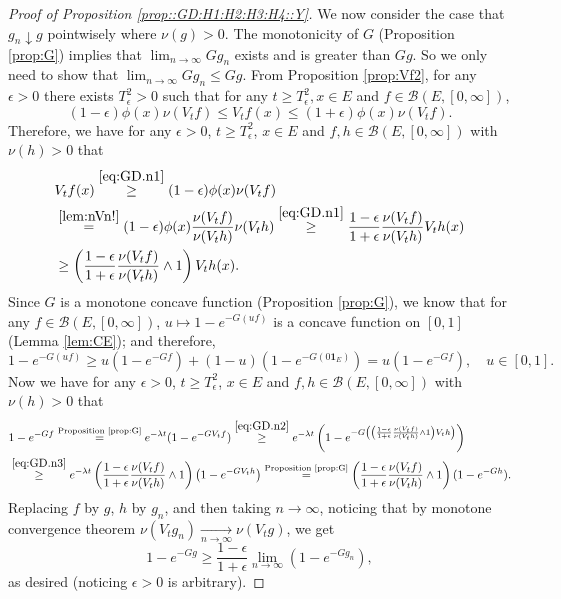 \documentclass[12pt,a4paper]{amsart}
\numberwithin{equation}{section}
\theoremstyle{plain}
\theoremstyle{definition}
\theoremstyle{remark}
\begin{document}
\begin{proof}[Proof of Proposition \ref{prop::GD:H1:H2:H3:H4::Y}]
	We now consider the case that $g_n \downarrow g$ pointwisely
	where $\nu(g) > 0$.
	The monotonicity of $G$ (Proposition \ref{prop:G}) implies that $\lim_{n \to \infty} Gg_n$ exists and is greater
	than $G g$.
	So we only need to show that $\lim_{n\to \infty} Gg_n \leq Gg$.
	From Proposition \ref{prop:Vf2}, for any $\epsilon>0$ there exists $T^2_\epsilon >0$ such that for any $t\geq T^2_\epsilon, x\in E$ and $f\in \mathcal B(E,[0,\infty])$,
\begin{equation} \label{eq:GD.n1}
	(1-\epsilon)\phi(x) \nu(V_tf)\leq V_tf(x)
	\leq (1+\epsilon)\phi(x) \nu(V_tf).
\end{equation}
	Therefore, we have for any $\epsilon>0$, $t \geq T^2_\epsilon$, $x\in E$ and $f, h\in \mathcal B(E,[0,\infty])$ with $\nu(h) >0$ that
\begin{align}
	&V_tf(x)
	\overset{\eqref{eq:GD.n1}}\geq (1-\epsilon)\phi(x) \nu(V_tf)
	\\& \overset{\eqref{lem:nVn!}}= (1-\epsilon)\phi(x) \frac{\nu(V_tf)}{\nu(V_th)} \nu(V_th)
\overset{\eqref{eq:GD.n1}}\geq \frac{1-\epsilon}{1+\epsilon} \frac{\nu(V_tf)}{\nu(V_th)} V_th(x)
	\\ \label{eq:GD.n2} & \geq \left(\frac{1-\epsilon}{1+\epsilon} \frac{\nu(V_tf)}{\nu(V_th)} \wedge 1\right) V_th(x).
\end{align}
	Since $G$ is a monotone concave function (Proposition \ref{prop:G}), we know that for any $f\in \mathcal B(E,[0,\infty])$, $u \mapsto 1 - e^{-G(uf)}$ is a concave function on $[0,1]$ (Lemma \ref{lem:CE}); and therefore,
\begin{equation} \label{eq:GD.n3}
	1 - e^{- G(uf)}\geq u(1- e^{- Gf}) + (1-u) (1- e^{- G(0  \mathbf 1_E)}) = u(1- e^{- Gf}), \quad u \in [0,1].
\end{equation}
	Now we have for any $\epsilon>0$, $t \geq T^2_\epsilon$, $x\in E$ and $f, h\in \mathcal B(E,[0,\infty])$ with $\nu(h) >0$ that
\begin{align}
	&1 - e^{-Gf}
	\overset{\text{Proposition \ref{prop:G}}}= e^{-\lambda t}(1- e^{- GV_t f})
	\overset{\eqref{eq:GD.n2}}\geq e^{-\lambda t}\left(1- e^{- G\left( \left(\frac{1-\epsilon}{1+\epsilon} \frac{\nu(V_tf)}{\nu(V_th)} \wedge 1\right) V_th\right) }\right)
	\\ &\overset{\eqref{eq:GD.n3}}\geq e^{-\lambda t} \left(\frac{1-\epsilon}{1+\epsilon} \frac{\nu(V_tf)}{\nu(V_th)} \wedge 1 \right) \left(1- e^{- GV_th }\right)
	\overset{\text{Proposition \ref{prop:G}}}= \left(\frac{1-\epsilon}{1+\epsilon} \frac{\nu(V_tf)}{\nu(V_th)} \wedge 1\right) (1 - e^{- Gh}).
\end{align}
	Replacing $f$ by $g$, $h$ by $g_n$, and then taking $n\to \infty$, noticing that by monotone convergence theorem $\nu(V_tg_n) \xrightarrow[n\to \infty]{} \nu(V_tg)$, we get
\begin{equation}
	1 - e^{- Gg} \geq \frac{1 - \epsilon}{1+\epsilon}\lim_{n\to \infty}(1 - e^{- Gg_n}),
\end{equation}
	as desired (noticing $\epsilon > 0$ is arbitrary).
\end{proof}
\end{document}
